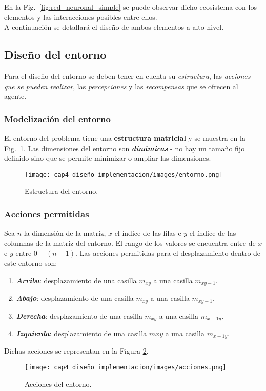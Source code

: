 En la Fig.~\ref{fig:red_neuronal_simple} se puede observar dicho ecosistema con los elementos y las interacciones posibles entre ellos. \\

A continuación se detallará el diseño de ambos elementos a alto nivel. 

\subsection{Diseño del entorno}

Para el diseño del entorno se deben tener en cuenta su \textit{estructura}, las \textit{acciones que se pueden realizar}, las \textit{percepciones} y las \textit{recompensas} que se ofrecen al agente. 

\subsubsection{Modelización del entorno} 

El entorno del problema tiene una \textbf{estructura matricial} y se muestra en la Fig.~\ref{fig:estructura_entorno}. Las dimensiones del entorno son \textbf{\textit{dinámicas}} - no hay un tamaño fijo definido sino que se permite minimizar o ampliar las dimensiones. 

\begin{figure}
    \centering
    \texttt{[image: cap4\_diseño\_implementacion/images/entorno.png]}
    \caption{Estructura del entorno.}
    \label{fig:estructura_entorno}
\end{figure}

\subsubsection{Acciones permitidas}

Sea $n$ la dimensión de la matriz, $x$ el índice de las filas e $y$ el índice de las columnas de la matriz del entorno. El rango de los valores se encuentra entre de $x$ e $y$ entre $0 - (n - 1)$. Las acciones permitidas para el desplazamiento dentro de este entorno son: 
\begin{enumerate}
    \item \textbf{\textit{Arriba}}: desplazamiento de una casilla $m_{xy}$ a una casilla $m_{xy-1}$.
    \item \textbf{\textit{Abajo}}: desplazamiento de una casilla $m_{xy}$ a una casilla $m_{xy+1}$.
    \item \textbf{\textit{Derecha}}: desplazamiento de una casilla $m_{xy}$ a una casilla $m_{x+1y}$.
    \item \textbf{\textit{Izquierda}}: desplazamiento de una casilla $m{xy}$ a una casilla $m_{x-1y}$. 
\end{enumerate}
Dichas acciones se representan en la Figura \ref{fig:acciones_entorno}. \\
\begin{figure}
    \centering
    \texttt{[image: cap4\_diseño\_implementacion/images/acciones.png]}
    \caption{Acciones del entorno.}
    \label{fig:acciones_entorno}
\end{figure}

